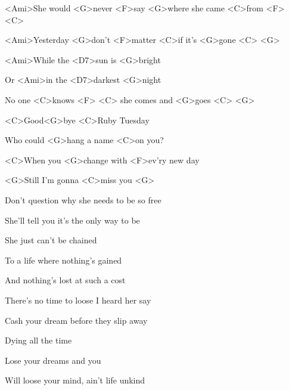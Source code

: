 

\zs
<Ami>She would <G>never <F>say <G>where she came <C>from <F> <C>

<Ami>Yesterday <G>don't <F>matter <C>if it's <G>gone <C> <G>

<Ami>While the <D7>sun is <G>bright

Or <Ami>in the <D7>darkest <G>night

No one <C>knows <F> <C> she comes and <G>goes <C> <G>
\ks

\zr
<C>Good<G>bye <C>Ruby Tuesday

Who could <G>hang a name <C>on you?

<C>When you <G>change with <F>ev'ry new day

<G>Still I'm gonna <C>miss you <G>
\kr

\zs
Don't question why she needs to be so free

She'll tell you it's the only way to be

She just can't be chained

To a life where nothing's gained

And nothing's lost at such a cost
\ks

\zr \kr

\zs
There's no time to loose I heard her say

Cash your dream before they slip away

Dying all the time

Lose your dreams and you

Will loose your mind, ain't life unkind
\ks

\kp





